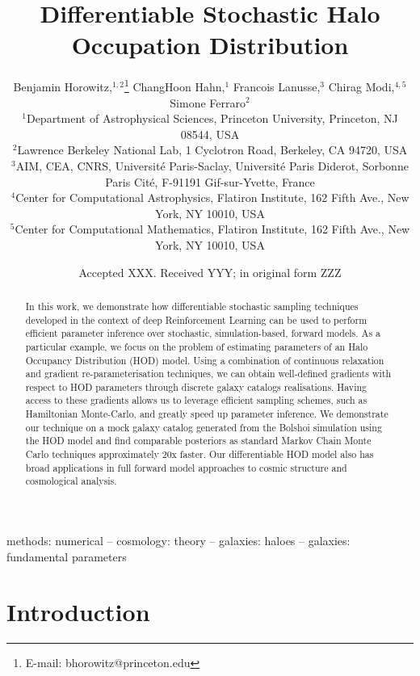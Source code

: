 \documentclass[a4paper,usenatbib]{mnras}
\title[DiffHOD]{Differentiable Stochastic Halo Occupation Distribution}
\author[B. Horowitz et al.]{
Benjamin Horowitz,$^{1,2}$\thanks{E-mail: bhorowitz@princeton.edu}
ChangHoon Hahn,$^{1}$
Francois Lanusse,$^{3}$
Chirag Modi,$^{4,5}$ \newauthor Simone Ferraro$^{2}$
\\
$^{1}$Department of Astrophysical Sciences, Princeton University, Princeton, NJ 08544, USA\\
$^{2}$Lawrence Berkeley National Lab, 1 Cyclotron Road, Berkeley, CA 94720, USA\\
$^{3}$AIM, CEA, CNRS, Universit\'e Paris-Saclay, Universit\'e Paris Diderot, Sorbonne Paris Cit\'e, F-91191 Gif-sur-Yvette, France\\
$^{4}$Center for Computational Astrophysics, Flatiron Institute, 162 Fifth Ave., New York, NY 10010, USA\\
$^{5}$Center for Computational Mathematics, Flatiron Institute, 162 Fifth Ave., New York, NY 10010, USA
}
\date{Accepted XXX. Received YYY; in original form ZZZ}
\begin{document}
\label{firstpage}
\pagerange{\pageref{firstpage}--\pageref{lastpage}}
\maketitle

\begin{abstract}
In this work, we demonstrate how differentiable stochastic sampling techniques developed in the context of deep Reinforcement Learning can be used to perform efficient parameter inference over stochastic, simulation-based, forward models. As a particular example, we focus on the problem of estimating parameters of an Halo Occupancy Distribution (HOD) model. Using a combination of continuous relaxation and gradient re-parameterisation techniques, we can obtain well-defined gradients with respect to HOD parameters through discrete galaxy catalogs realisations. Having access to these gradients allows us to leverage efficient sampling schemes, such as Hamiltonian Monte-Carlo, and greatly speed up parameter inference.
We demonstrate our technique on a mock galaxy catalog generated from the Bolshoi simulation using the 
\cite{2007zheng} %
HOD model and find %
comparable posteriors as standard Markov Chain Monte Carlo techniques approximately 20x faster. 
Our differentiable HOD model %
also has broad applications in full forward model approaches to cosmic structure and cosmological analysis. 
\end{abstract}

\begin{keywords}
methods: numerical -- cosmology: theory -- galaxies: haloes -- galaxies: fundamental parameters
\end{keywords}



\section{Introduction}

\end{document}
